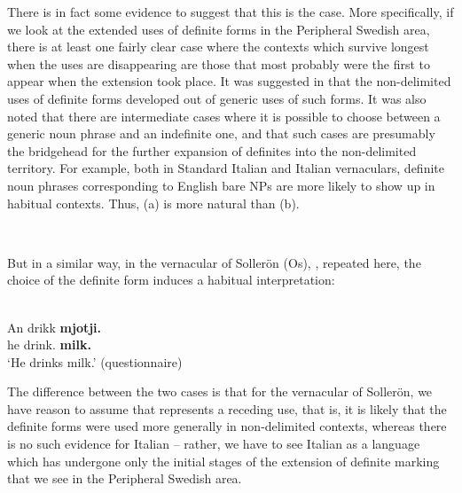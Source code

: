 There is in fact some evidence to suggest that this is the case. More specifically, if we look at the extended uses of definite forms in the Peripheral Swedish area, there is at least one fairly clear case where the contexts which survive longest when the uses are disappearing are those that most probably were the first to appear when the extension took place. It was suggested in  that the non-delimited uses of definite forms developed out of generic uses of such forms. It was also noted that there are intermediate cases where it is possible to choose between a generic noun phrase and an indefinite one, and that such cases are presumably the bridgehead for the further expansion of definites into the non-delimited territory. For example, both in Standard Italian and Italian vernaculars, definite noun phrases corresponding to English bare NPs are more likely to show up in habitual contexts. Thus, (a) is more natural than (b).

\ea\label{}
\\

\z 
\z

But in a similar way, in the vernacular of Sollerön (Os), , repeated here, the choice of the definite form induces a habitual interpretation:

\ea\label{ex:54}
\\
\gll An  drikk  \textbf{mjotji.}\\
he  drink.{\prs}  \textbf{milk.{}}\\
\glt ‘He drinks milk.’ (questionnaire)
\z

The difference between the two cases is that for the vernacular of Sollerön, we have reason to assume that  represents a receding use, that is, it is likely that the definite forms were used more generally in non-delimited contexts, whereas there is no such evidence for Italian – rather, we have to see Italian as a language which has undergone only the initial stages of the extension of definite marking that we see in the Peripheral Swedish area. 

